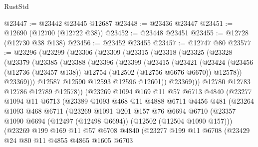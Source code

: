 \begin{lexlean}{RustStd}
\begin{coremodule}
@23447 := @23442 @23445 @12687
@23448 := @23436 @23447
@23451 := @12690 (@12700 (@12722 @38))
@23452 := @23448 @23451
@23455 := @12728 (@12730 @38 @138)
@23456 := @23452 @23455
@23457 := @12747 @80
@23577 := @23296
    (@23299
      (@23306
        (@23309
          (@23315
            (@23318
              (@23325
                (@23328
                  (@23379
                    (@23385
                      (@23388
                        (@23396
                          (@23399
                            (@23415
                              (@23421
                                (@23424
                                  (@23456
                                    (@12736 (@23457 @138))
                                    @12754
                                    (@12502 (@12756 @6676 @6670))
                                    @12578))
                                @23369)))
                          @12587
                          @12590
                          @12593
                          @12596
                          @12601))
                      @23369)))
                @12780
                @12783
                @12786
                @12789
                @12578))
            (@23269
              @1094
              @169
              @11
              @57
              @6713
              @4840
              (@23277
                @1094
                @11
                @6713
                (@23389
                  @1093
                  @468
                  @11
                  @4888
                  @6711
                  @4456
                  @481
                  (@23264
                    @1093
                    @468
                    @6711
                    (@23269
                      @1091
                      @201
                      @157
                      @76
                      @6694
                      @6710
                      (@23357 @1090 @6694 (@12497 (@12498 @6694)) (@12502 (@12504 @1090 @157)))
                      (@23269
                        @199
                        @169
                        @11
                        @57
                        @6708
                        @4840
                        (@23277
                          @199
                          @11
                          @6708
                          (@23429
                            @24
                            @80
                            @11
                            @4855
                            @4865
                            @1605
                            @6703

\end{coremodule}
\end{lexlean}
